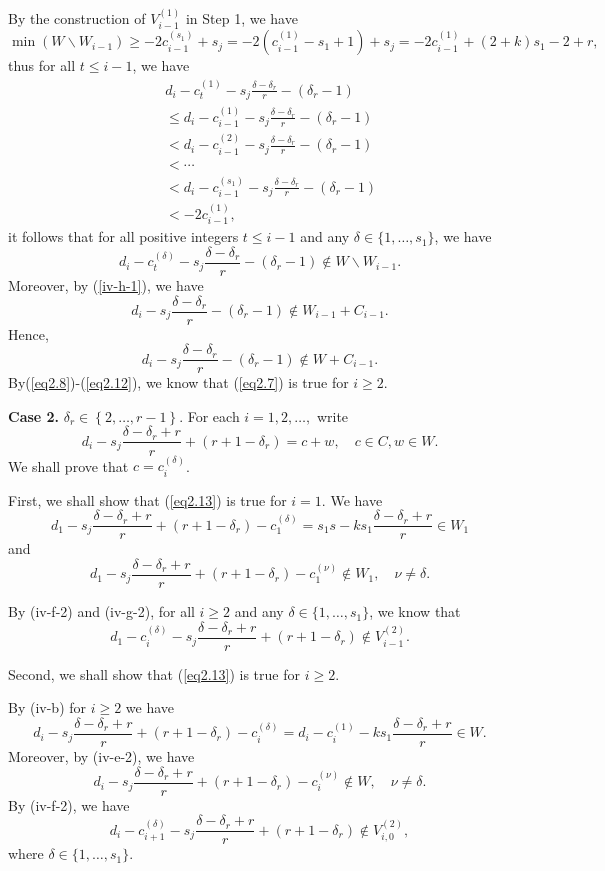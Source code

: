 \documentclass[12pt]{article}
\numberwithin{equation}{section}
\begin{document}
By the construction of $V_{i-1}^{(1)}$ in Step 1, we have
$$\min (W\backslash W_{i-1})\geqslant -2c_{i-1}^{(s_1)}+s_j=-2(c_{i-1}^{(1)}-s_1+1)+s_j=-2c_{i-1}^{(1)}+(2+k)s_1-2+r,$$
thus for all $t\leqslant i-1$, we have
\begin{eqnarray*}
&&d_{i}-c_{t}^{(1)}-s_j\frac{\delta-\delta_r}{r}-(\delta_r-1)\\
&&\leq d_{i}-c_{i-1}^{(1)}-s_j\frac{\delta-\delta_r}{r}-(\delta_r-1)\\
&&< d_{i}-c_{i-1}^{(2)}-s_j\frac{\delta-\delta_r}{r}-(\delta_r-1)\\
&&< \cdots \\
&&< d_{i}-c_{i-1}^{(s_1)}-s_j\frac{\delta-\delta_r}{r}-(\delta_r-1)\\
&&<-2c_{i-1}^{(1)},
\end{eqnarray*}
it follows that for all positive integers $t\leqslant i-1$ and any $\delta\in\{1,\ldots,s_1\}$, we have $$d_{i}-c_{t}^{(\delta)}-s_j\frac{\delta-\delta_r}{r}-(\delta_r-1)\notin W\backslash W_{i-1}.$$
Moreover, by (\ref{iv-h-1}), we have
$$d_{i}-s_j\frac{\delta-\delta_r}{r}-(\delta_r-1)\notin W_{i-1}+C_{i-1}.$$
Hence, \begin{equation}\label{eq2.12}d_{i}-s_j\frac{\delta-\delta_r}{r}-(\delta_r-1)\notin W+C_{i-1}.\end{equation}
By(\ref{eq2.8})-(\ref{eq2.12}), we know that (\ref{eq2.7}) is true for $i\geqslant 2$.

{\bf Case 2.} $ \delta_r\in \left\{2,\dots,r-1\right\}$. For each $i=1,2,\ldots,$
write
\begin{equation}\label{eq2.13}d_{i}-s_j\frac{\delta-\delta_r+r}{r}+(r+1-\delta_r)=c+w, \quad c\in C, w\in W.\end{equation}
We shall prove that $c=c_i^{(\delta)}$.

First, we shall show that (\ref{eq2.13}) is true for $i=1$.
We have $$d_{1}-s_j\frac{\delta-\delta_r+r}{r}+(r+1-\delta_r)-c_1^{(\delta)}=s_1s-ks_1\frac{\delta-\delta_r+r}{r}\in W_{1}$$
and
$$d_{1}-s_j\frac{\delta-\delta_r+r}{r}+(r+1-\delta_r)-c_{1}^{(\nu)}\notin W_{1}, \quad \nu\neq \delta.$$

By (iv-f-2) and (iv-g-2), for all $i\geqslant 2$ and any $\delta\in\{1,\ldots,s_1\}$, we know that $$d_{1}-c_{i}^{(\delta)}-s_j\frac{\delta-\delta_r+r}{r}+(r+1-\delta_r)\notin V_{i-1}^{(2)}.$$

Second, we shall show that (\ref{eq2.13}) is true for $i\geqslant 2$.

By (iv-b) for  $i\geqslant 2$ we have
\begin{equation}\label{eq2.14}d_{i}-s_j\frac{\delta-\delta_r+r}{r}+(r+1-\delta_r)-c_{i}^{(\delta)}=d_{i}-c_{i}^{(1)}-ks_1\frac{\delta-\delta_r+r}{r}\in W. \end{equation}
Moreover, by (iv-e-2), we have
\begin{equation}\label{eq2.15}d_{i}-s_j\frac{\delta-\delta_r+r}{r}+(r+1-\delta_r)-c_{i}^{(\nu)}\notin W, \quad \nu\neq \delta. \end{equation}
By (iv-f-2), we have
\begin{equation}\label{eq2.16}d_{i}-c_{i+1}^{(\delta)}-s_j\frac{\delta-\delta_r+r}{r}+(r+1-\delta_r)\notin V_{i,0}^{(2)},\end{equation}
where $\delta\in\{1,\ldots,s_1\}.$
\end{document}
